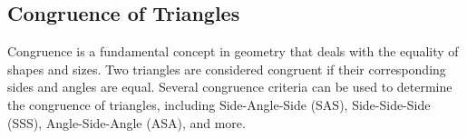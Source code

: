 \documentclass[a4paper,12pt]{book}
\begin{document}
\begin{comment}
            \draw pic[draw,angle radius=0.4cm,"$\alpha$",angle eccentricity=1.5] {angle=B--A--C};
            \draw pic[draw,angle radius=0.4cm,"$\beta$",angle eccentricity=1.5] {angle=C--B--A};
            \draw pic[draw,angle radius=0.4cm,"$\gamma$",angle eccentricity=1.5] {angle=A--C--B};
        </tikzpicture}
        \caption{Obtuse Triangle}
        \label{fig:obtuse_triangle}
    \end{figure}
    
    \item \textbf{Right Triangle:} One angle is a right angle ($90^\circ$). (See Figure \ref{fig:right_triangle})
    
    \begin{figure}[H]
        \centering
        \begin{tikzpicture}
            \coordinate (A) at (0,0);
            \coordinate (B) at (2,0);
            \coordinate (C) at (0,1.5);
            
            \draw (A) -- (B) -- (C) -- cycle;
            
            \node[below] at (A) {$A$};
            \node[below] at (B) {$B$};
            \node[left] at (C) {$C$};
            
            \draw (A) -- node[above left] {$a$} (C);
            \draw (B) -- node[above right] {$b$} (C);
            \draw (A) -- node[below] {$c$} (B);
            
            \draw pic[draw,angle radius=0.4cm,"$\alpha$",angle eccentricity=1.5] {angle=B--A--C};
            \draw pic[draw,angle radius=0.4cm,"$\beta$",angle eccentricity=1.5] {angle=C--B--A};
            \draw pic[draw,angle radius=0.4cm,"$90^\circ$",angle eccentricity=1.5] {angle=A--C--B};
        \end{tikzpicture}
        \caption{Right Triangle}
        \label{fig:right_triangle}
    \end{figure}
\end{enumerate}
\end{comment}
\subsection{Congruence of Triangles}

Congruence is a fundamental concept in geometry that deals with the equality of shapes and sizes. Two triangles are considered congruent if their corresponding sides and angles are equal. Several congruence criteria can be used to determine the congruence of triangles, including Side-Angle-Side (SAS), Side-Side-Side (SSS), Angle-Side-Angle (ASA), and more.
\end{document}
